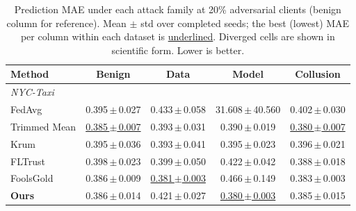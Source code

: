 \begin{table}[t]
\centering
\small
\setlength{\tabcolsep}{5pt}
\caption{Prediction MAE under each attack family at 20\% adversarial clients (benign column for reference). Mean $\pm$ std over completed seeds; the best (lowest) MAE per column within each dataset is \underline{underlined}. Diverged cells are shown in scientific form. Lower is better.}
\label{tab:combined}
\begin{tabular}{lcccc}
\toprule
\textbf{Method} & \textbf{Benign} & \textbf{Data} & \textbf{Model} & \textbf{Collusion} \\
\midrule
\multicolumn{5}{l}{\textit{NYC-Taxi}} \\
FedAvg & 0.395\,$\pm$\,0.027 & 0.433\,$\pm$\,0.058 & 31.608\,$\pm$\,40.560 & 0.402\,$\pm$\,0.030 \\
Trimmed Mean & \underline{0.385\,$\pm$\,0.007} & 0.393\,$\pm$\,0.031 & 0.390\,$\pm$\,0.019 & \underline{0.380\,$\pm$\,0.007} \\
Krum & 0.395\,$\pm$\,0.036 & 0.393\,$\pm$\,0.041 & 0.395\,$\pm$\,0.023 & 0.396\,$\pm$\,0.021 \\
FLTrust & 0.398\,$\pm$\,0.023 & 0.399\,$\pm$\,0.050 & 0.422\,$\pm$\,0.042 & 0.388\,$\pm$\,0.018 \\
FoolsGold & 0.386\,$\pm$\,0.009 & \underline{0.381\,$\pm$\,0.003} & 0.466\,$\pm$\,0.149 & 0.383\,$\pm$\,0.003 \\
\textbf{Ours} & 0.386\,$\pm$\,0.014 & 0.421\,$\pm$\,0.027 & \underline{0.380\,$\pm$\,0.003} & 0.385\,$\pm$\,0.015 \\
\bottomrule
\end{tabular}
\end{table}
